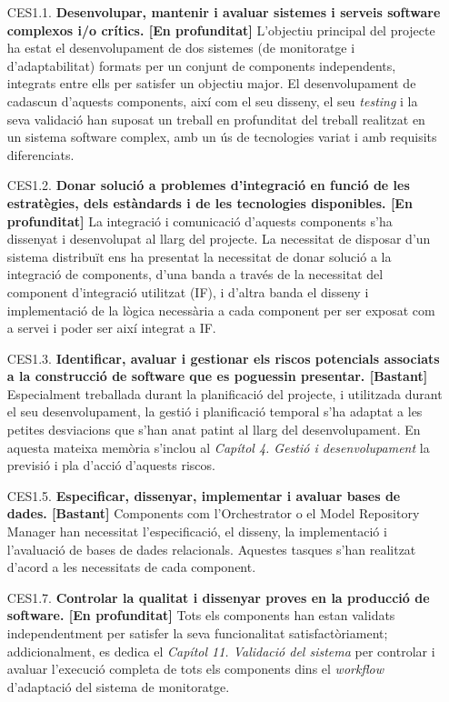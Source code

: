 \begin{enumerate}
\item [CES1.1.] \textbf{Desenvolupar, mantenir i avaluar sistemes i serveis software complexos i/o crítics. [En profunditat]}
\subitem L'objectiu principal del projecte ha estat el desenvolupament de dos sistemes (de monitoratge i d'adaptabilitat) formats per un conjunt de components independents, integrats entre ells per satisfer un objectiu major. El desenvolupament de cadascun d'aquests components, així com el seu disseny, el seu \textit{testing} i la seva validació han suposat un treball en profunditat del treball realitzat en un sistema software complex, amb un ús de tecnologies variat i amb requisits diferenciats.
\item [CES1.2.] \textbf{Donar solució a problemes d'integració en funció de les estratègies, dels estàndards i de les tecnologies disponibles. [En profunditat]}
\subitem La integració i comunicació d'aquests components s'ha dissenyat i desenvolupat al llarg del projecte. La necessitat de disposar d'un sistema distribuït ens ha presentat la necessitat de donar solució a la integració de components, d'una banda a través de la necessitat del component d'integració utilitzat (IF), i d'altra banda el disseny i implementació de la lògica necessària a cada component per ser exposat com a servei i poder ser així integrat a IF.
\item [CES1.3.] \textbf{Identificar, avaluar i gestionar els riscos potencials associats a la construcció de software que es poguessin presentar. [Bastant]}
\subitem Especialment treballada durant la planificació del projecte, i utilitzada durant el seu desenvolupament, la gestió i planificació temporal s'ha adaptat a les petites desviacions que s'han anat patint al llarg del desenvolupament. En aquesta mateixa memòria s'inclou al \textit{Capítol 4. Gestió i desenvolupament} la previsió i pla d'acció d'aquests riscos.
\item [CES1.5.] \textbf{Especificar, dissenyar, implementar i avaluar bases de dades.  [Bastant]}
\subitem Components com l'Orchestrator o el Model Repository Manager han necessitat l'especificació, el disseny, la implementació i l'avaluació de bases de dades relacionals. Aquestes tasques s'han realitzat d'acord a les necessitats de cada component.
\item [CES1.7.] \textbf{Controlar la qualitat i dissenyar proves en la producció de software. [En profunditat]}
\subitem Tots els components han estan validats independentment per satisfer la seva funcionalitat satisfactòriament; addicionalment, es dedica el \textit{Capítol 11. Validació del sistema} per controlar i avaluar l'execució completa de tots els components dins el \textit{workflow} d'adaptació del sistema de monitoratge.

\end{enumerate}
